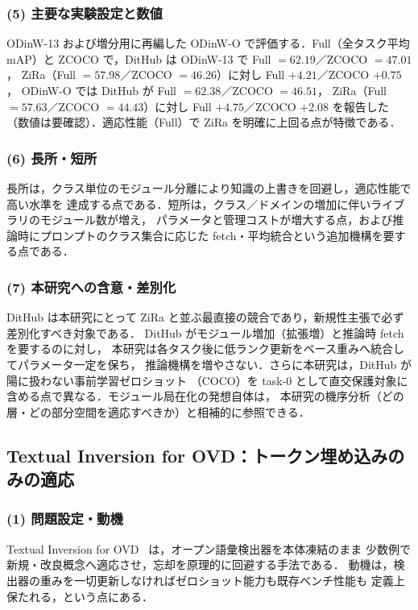 \subsubsection*{(5) 主要な実験設定と数値}
ODinW-13 および増分用に再編した ODinW-O で評価する．Full（全タスク平均 mAP）と
ZCOCO で，DitHub は ODinW-13 で Full $=62.19$／ZCOCO $=47.01$，
ZiRa（Full $=57.98$／ZCOCO $=46.26$）に対し Full $+4.21$／ZCOCO $+0.75$，
ODinW-O では DitHub が Full $=62.38$／ZCOCO $=46.51$，
ZiRa（Full $=57.63$／ZCOCO $=44.43$）に対し Full $+4.75$／ZCOCO $+2.08$ を報告した
（数値は要確認）．適応性能（Full）で ZiRa を明確に上回る点が特徴である．

\subsubsection*{(6) 長所・短所}
長所は，クラス単位のモジュール分離により知識の上書きを回避し，適応性能で高い水準を
達成する点である．短所は，クラス／ドメインの増加に伴いライブラリのモジュール数が増え，
パラメータと管理コストが増大する点，および推論時にプロンプトのクラス集合に応じた
fetch・平均統合という追加機構を要する点である．

\subsubsection*{(7) 本研究への含意・差別化}
DitHub は本研究にとって ZiRa と並ぶ最直接の競合であり，新規性主張で必ず差別化すべき対象である．
DitHub がモジュール増加（拡張増）と推論時 fetch を要するのに対し，
本研究は各タスク後に低ランク更新をベース重みへ統合してパラメータ一定を保ち，
推論機構を増やさない．さらに本研究は，DitHub が陽に扱わない事前学習ゼロショット
（COCO）を task-0 として直交保護対象に含める点で異なる．モジュール局在化の発想自体は，
本研究の機序分析（どの層・どの部分空間を適応すべきか）と相補的に参照できる．

\subsection{Textual Inversion for OVD：トークン埋め込みのみの適応}
\label{sub:textinv}

\subsubsection*{(1) 問題設定・動機}
Textual Inversion for OVD~\cite{textinv} は，オープン語彙検出器を本体凍結のまま
少数例で新規・改良概念へ適応させ，忘却を原理的に回避する手法である．
動機は，検出器の重みを一切更新しなければゼロショット能力も既存ベンチ性能も
定義上保たれる，という点にある．

